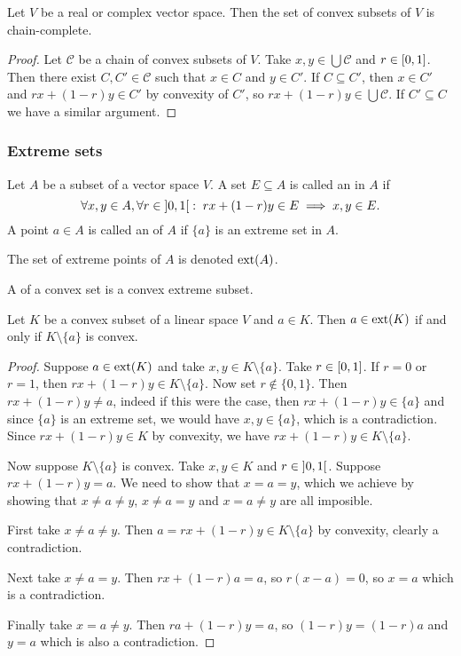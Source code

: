 \begin{lemma} \label{convexSetsChainComplete}
Let $V$ be a real or complex vector space. Then the set of convex subsets of $V$ is chain-complete.
\end{lemma}
\begin{proof}
Let $\mathcal{C}$ be a chain of convex subsets of $V$. Take $x,y\in \bigcup \mathcal{C}$ and $r\in \interval{0,1}$. Then there exist $C, C'\in \mathcal{C}$ such that $x\in C$ and $y\in C'$. If $C\subseteq C'$, then $x\in C'$ and $rx+(1-r)y\in C'$ by convexity of $C'$, so $rx+(1-r)y\in \bigcup\mathcal{C}$. If $C'\subseteq C$ we have a similar argument.
\end{proof}

\subsubsection{Extreme sets}
\begin{definition}
Let $A$ be a subset of a vector space $V$. A set $E\subseteq A$ is called an  in $A$ if
\[ \forall x,y\in A, \forall r\in\interval[o]{0,1}: \; rx+(1-r)y\in E \implies x,y\in E. \]
A point $a\in A$ is called an  of $A$ if $\{a\}$ is an extreme set in $A$.

The set of extreme points of $A$ is denoted $\operatorname{ext}(A)$.

A  of a convex set is a convex extreme subset.
\end{definition}

\begin{lemma} \label{extremePointCosetConvex}
Let $K$ be a convex subset of a linear space $V$ and $a\in K$. Then $a\in \operatorname{ext}(K)$ \textup{if and only if} $K\setminus\{a\}$ is convex.
\end{lemma}
\begin{proof}
Suppose $a\in\operatorname{ext}(K)$ and take $x,y\in K\setminus\{a\}$. Take $r\in \interval{0,1}$. If $r=0$ or $r=1$, then $rx+(1-r)y\in K\setminus\{a\}$. Now set $r\notin\{0,1\}$. Then $rx+(1-r)y \neq a$, indeed if this were the case, then $rx+(1-r)y \in \{a\}$ and since $\{a\}$ is an extreme set, we would have $x,y\in \{a\}$, which is a contradiction. Since $rx+(1-r)y\in K$ by convexity, we have $rx+(1-r)y\in K\setminus\{a\}$.

Now suppose $K\setminus\{a\}$ is convex. Take $x,y\in K$ and $r\in \interval[o]{0,1}$. Suppose $rx+(1-r)y = a$. We need to show that $x=a=y$, which we achieve by showing that $x\neq a \neq y$, $x\neq a=y$ and $x=a\neq y$ are all imposible.

First take $x\neq a \neq y$. Then $a = rx+(1-r)y \in K\setminus \{a\}$ by convexity, clearly a contradiction.

Next take $x\neq a=y$. Then $rx+(1-r)a = a$, so $r(x-a) = 0$, so $x=a$ which is a contradiction.

Finally take $x=a \neq y$. Then $ra+(1-r)y = a$, so $(1-r)y = (1-r)a$ and $y=a$ which is also a contradiction.
\end{proof}


